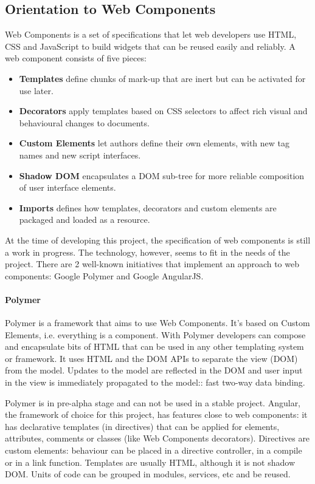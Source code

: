 \subsection{Orientation to Web Components}
Web Components is a set of specifications that let web developers use \ac{HTML}, \ac{CSS} and JavaScript to build widgets that can be reused easily and reliably.
A web component consists of five pieces\cite{W3CComponents:2013}:
\begin{itemize}
    \item \textbf{Templates} define chunks of mark-up that are inert but can be activated for use later.
    \item \textbf{Decorators} apply templates based on CSS selectors to affect rich visual and behavioural changes to documents.
    \item \textbf{Custom Elements} let authors define their own elements, with new tag names and new script interfaces.
    \item \textbf{Shadow DOM}  encapsulates a DOM sub-tree for more reliable composition of user interface elements.
    \item \textbf{Imports} defines how templates, decorators and custom elements are packaged and loaded as a resource.
\end{itemize}

At the time of developing this project, the specification of web components is still a work in progress.
The technology, however, seems to fit in the needs of the project.
There are 2 well-known initiatives that implement an approach to web components: Google Polymer and Google AngularJS.

\paragraph{Polymer} Polymer is a framework that aims to use Web Components. 
It's based on Custom Elements, i.e. everything is a component.
With Polymer developers can compose and encapsulate bits of HTML that can be used in any other templating system or framework.
It uses \ac{HTML} and the \ac{DOM} \acp{API} to separate the view (\ac{DOM}) from the model. 
Updates to the model are reflected in the \ac{DOM} and user input in the view is immediately propagated to the model:: fast two-way data binding.

Polymer is in pre-alpha stage and can not be used in a stable project.
Angular, the framework of choice for this project, has features close to web components: it has declarative templates (in directives) that can be applied for elements, attributes, comments or classes (like Web Components decorators).
Directives are custom elements: behaviour can be placed in a directive controller, in a compile or in a link function.
Templates are usually \ac{HTML}, although it is not shadow \ac{DOM}.
Units of code can be grouped in modules, services, etc and be reused.

